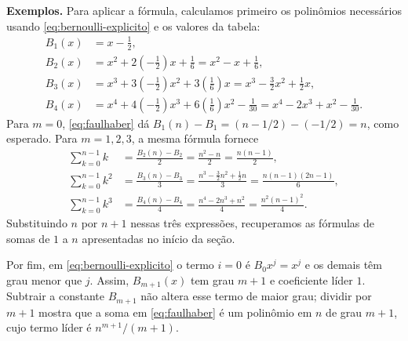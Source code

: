 \documentclass[12pt,portuguese]{article}
\theoremstyle{definition}
\theoremstyle{plainexercise}
\theoremstyle{starredexercise}
\theoremstyle{definition}
\begin{document}
\medskip
\noindent\textbf{Exemplos.}
Para aplicar a fórmula, calculamos primeiro os polinômios necessários
usando \eqref{eq:bernoulli-explicito} e os valores da tabela:
\begin{align*}
B_1(x)&=x-\frac12,\\[0.2cm]
B_2(x)&=x^2+2\left(-\frac12\right)x+\frac16
=x^2-x+\frac16,\\[0.2cm]
B_3(x)&=x^3+3\left(-\frac12\right)x^2
+3\left(\frac16\right)x=x^3-\frac32x^2+\frac12x,\\[0.2cm]
B_4(x)&=x^4+4\left(-\frac12\right)x^3
+6\left(\frac16\right)x^2-\frac1{30}
=x^4-2x^3+x^2-\frac1{30}.
\end{align*}
Para $m=0$, \eqref{eq:faulhaber} dá
$B_1(n)-B_1=(n-1/2)-(-1/2)=n$, como esperado.
Para $m=1,2,3$, a mesma fórmula fornece
\begin{align*}
\sum_{k=0}^{n-1}k
&=\frac{B_2(n)-B_2}{2}
=\frac{n^2-n}{2}=\frac{n(n-1)}{2},\\[0.3cm]
\sum_{k=0}^{n-1}k^2
&=\frac{B_3(n)-B_3}{3}
=\frac{n^3-\tfrac{3}{2}n^2+\tfrac{1}{2}n}{3}
=\frac{n(n-1)(2n-1)}{6},\\[0.3cm]
\sum_{k=0}^{n-1}k^3
&=\frac{B_4(n)-B_4}{4}
=\frac{n^4-2n^3+n^2}{4}
=\frac{n^2(n-1)^2}{4}.
\end{align*}
Substituindo $n$ por $n+1$ nessas três expressões, recuperamos as
fórmulas de somas de $1$ a $n$ apresentadas no início da seção.

Por fim, em \eqref{eq:bernoulli-explicito} o termo $i=0$ é
$B_0x^j=x^j$ e os demais têm grau menor que $j$. Assim, $B_{m+1}(x)$
tem grau $m+1$ e coeficiente líder $1$. Subtrair a constante $B_{m+1}$
não altera esse termo de maior grau; dividir por $m+1$ mostra que a soma
em \eqref{eq:faulhaber} é um polinômio em $n$ de grau $m+1$, cujo
termo líder é $n^{m+1}/(m+1)$.
\end{document}
